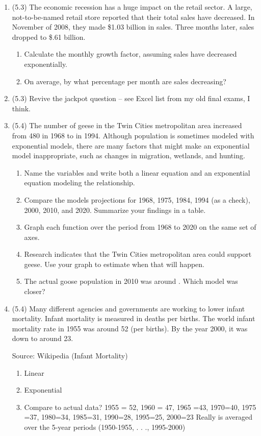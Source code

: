 \documentclass[12pt]{article}
\begin{document}
\begin{enumerate}
\item  (5.3) The economic recession has a huge impact on the retail sector.  A large, not-to-be-named retail store reported that their total sales have decreased.  In November of 2008, they made \$1.03 billion in sales.  Three months later, sales dropped to \$.61 billion.
\begin{enumerate}
\item Calculate the monthly growth factor, assuming sales have decreased exponentially.
\item On average, by what percentage per month are sales decreasing?
\end{enumerate}

\item (5.3) Revive the jackpot question -- see Excel list from my old final exams, I think.


\item (5.4) The number of geese in the Twin Cities metropolitan area increased from 480 in 1968 to  in 1994.  Although population is sometimes modeled with exponential models, there are many factors that might make an exponential model inappropriate, such as changes in migration, wetlands, and hunting.
\begin{enumerate}
\item Name the variables and write both a linear equation and an exponential equation modeling the relationship.
\item Compare the models projections for 1968, 1975, 1984, 1994 (as a check), 2000, 2010, and 2020.  Summarize your findings in a table.
\item Graph each function over the period from 1968 to 2020 on the same set of axes.
\item Research indicates that the Twin Cities metropolitan area could support  geese.  Use your graph to estimate when that will happen.
\item The actual goose population in 2010 was around .  Which model was closer?
\end{enumerate}  %

\item (5.4) Many different agencies and governments are working to lower infant mortality.  Infant mortality is measured in deaths per  births.  The world infant mortality rate in 1955 was around 52 (per  births).  By the year 2000, it was down to around 23.
\hfill \begin{footnotesize}  Source: Wikipedia (Infant Mortality) \end{footnotesize}
\begin{enumerate}
\item Linear
\item Exponential
\item Compare to actual data?  1955 = 52, 1960 = 47, 1965 =43, 1970=40, 1975 =37, 1980=34, 1985=31, 1990=28, 1995=25, 2000=23 Really is averaged over the 5-year periods (1950-1955, . . ., 1995-2000)
\end{enumerate}


\end{enumerate}
\end{document}
